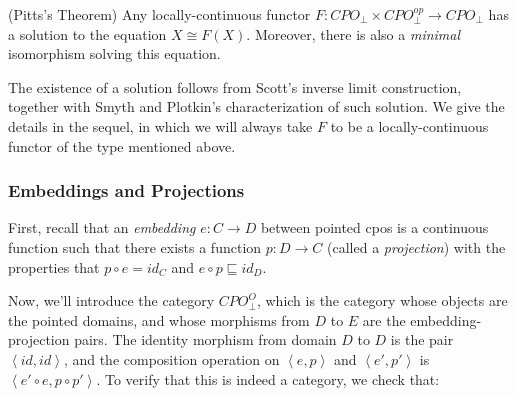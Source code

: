 \begin{prop}{(Pitts's Theorem)}
Any locally-continuous functor $F : CPO_\bot \times CPO^{op}_\bot \to
CPO_\bot$ has a solution to the equation $X \cong F(X)$. Moreover, there
is also a \emph{minimal} isomorphism solving this equation. 
\end{prop}

The existence of a solution follows from Scott's inverse limit
construction, together with Smyth and Plotkin's characterization of
such solution. We give the details in the sequel, in which we will
always take $F$ to be a locally-continuous functor of the type
mentioned above.

\subsubsection{Embeddings and Projections}

First, recall that an \emph{embedding} $e : C \to D$ between pointed
cpos is a continuous function such that there exists a function $p : D
\to C$ (called a \emph{projection}) with the properties that $p \circ
e = id_C$ and $e \circ p \sqsubseteq id_D$. 

Now, we'll introduce the category $CPO_\bot^{O}$, which is the
category whose objects are the pointed domains, and whose morphisms
from $D$ to $E$ are the embedding-projection pairs. The identity
morphism from domain $D$ to $D$ is the pair $\left<id, id\right>$, and
the composition operation on $\left<e, p\right>$ and $\left<e',
p'\right>$ is $\left<e' \circ e, p \circ p'\right>$. To verify that
this is indeed a category, we check that:


